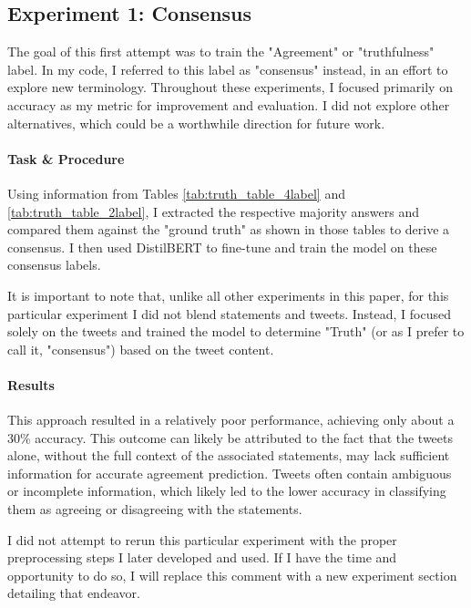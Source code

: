 \documentclass[14]{article}
\begin{document}
\subsection{Experiment 1: Consensus}

The goal of this first attempt was to train the "Agreement" or "truthfulness" label. In my code, I referred to this label as "consensus" instead, in an effort to explore new terminology. Throughout these experiments, I focused primarily on accuracy as my metric for improvement and evaluation. I did not explore other alternatives, which could be a worthwhile direction for future work.

\paragraph{Task \& Procedure}

Using information from Tables \ref{tab:truth_table_4label} and \ref{tab:truth_table_2label}, I extracted the respective majority answers and compared them against the "ground truth" as shown in those tables to derive a consensus. I then used DistilBERT \cite{distilbert} to fine-tune and train the model on these consensus labels.

It is important to note that, unlike all other experiments in this paper, for this particular experiment I did not blend statements and tweets. Instead, I focused solely on the tweets and trained the model to determine "Truth" (or as I prefer to call it, "consensus") based on the tweet content.

\paragraph{Results}

This approach resulted in a relatively poor performance, achieving only about a 30\% accuracy. This outcome can likely be attributed to the fact that the tweets alone, without the full context of the associated statements, may lack sufficient information for accurate agreement prediction. Tweets often contain ambiguous or incomplete information, which likely led to the lower accuracy in classifying them as agreeing or disagreeing with the statements.

I did not attempt to rerun this particular experiment with the proper preprocessing steps I later developed and used. If I have the time and opportunity to do so, I will replace this comment with a new experiment section detailing that endeavor.
\end{document}
